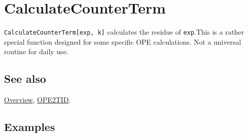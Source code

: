 \documentclass[../FeynCalcManual.tex]{subfiles}
\begin{document}
\hypertarget{calculatecounterterm}{
\section{CalculateCounterTerm}\label{calculatecounterterm}}

\texttt{CalculateCounterTerm[\allowbreak{}exp,\ \allowbreak{}k]}
calculates the residue of \texttt{exp}.This is a rather special function
designed for some specific OPE calculations. Not a universal routine for
daily use.

\subsection{See also}

\hyperlink{toc}{Overview}, \hyperlink{ope2tid}{OPE2TID}.

\subsection{Examples}
\end{document}
